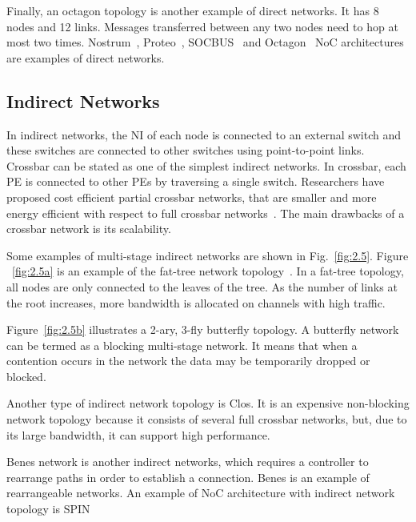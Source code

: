 Finally, an octagon topology is another example of direct networks. It has 8 nodes and 12 links. Messages transferred between any two nodes need to hop at most two times. Nostrum~\cite{Kumar}, Proteo~\cite{Tortosa}, SOCBUS~\cite{Smit} and Octagon~\cite{Karim} NoC architectures are examples of direct networks.

\subsection{Indirect Networks}

In indirect networks, the NI of each node is connected to an external switch and these switches are connected to other switches using point-to-point links. Crossbar can be stated as one of the simplest indirect networks. In crossbar, each PE is connected to other PEs by traversing a single switch. Researchers have proposed cost efficient partial crossbar networks, that are smaller and more energy efficient with respect to full crossbar networks~\cite{Pasricha2006}. The main drawbacks of a crossbar network is its scalability.

Some examples of multi-stage indirect networks are shown in Fig.~\ref{fig:2.5}. Figure ~\ref{fig:2.5a} is an example of the fat-tree network topology~\cite{Guerrier2000, Leiserson1985}. In a fat-tree topology, all nodes are only connected to the leaves of the tree. As the number of links at the root increases, more bandwidth is allocated on channels with high traffic. 

Figure~\ref{fig:2.5b} illustrates a 2-ary, 3-fly butterfly topology. A butterfly network can be termed as a blocking multi-stage network. It means that when a contention occurs in the network the data may be temporarily dropped or blocked. 

Another type of indirect network topology is Clos. It is an expensive non-blocking network topology because it consists of several full crossbar networks, but, due to its large bandwidth, it can support high performance. 

Benes network is another indirect networks, which requires a controller to rearrange paths in order to establish a connection. Benes is an example of rearrangeable networks. An example of NoC architecture with indirect network topology is SPIN~\cite{Adriahantenaina}


